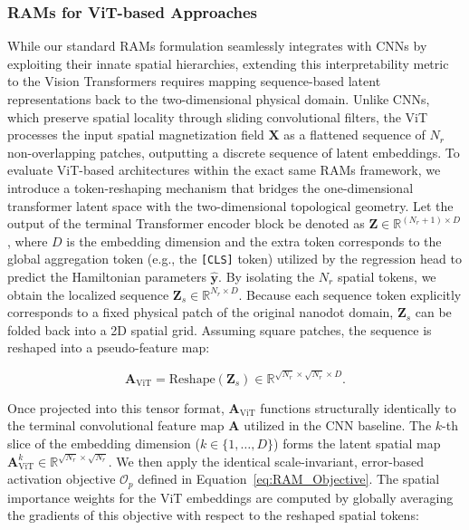 \documentclass[final,5p,times,twocolumn]{elsarticle}
\begin{document}
\subsubsection{RAMs for ViT-based Approaches}\label{sec:ViT_RAMs}
While our standard RAMs formulation seamlessly integrates with CNNs by exploiting their innate spatial hierarchies, extending this interpretability metric to the Vision Transformers requires mapping sequence-based latent representations back to the two-dimensional physical domain. Unlike CNNs, which preserve spatial locality through sliding convolutional filters, the ViT processes the input spatial magnetization field $\mathbf{X}$ as a flattened sequence of $N_r$ non-overlapping patches, outputting a discrete sequence of latent embeddings. To evaluate ViT-based architectures within the exact same RAMs framework, we introduce a token-reshaping mechanism that bridges the one-dimensional transformer latent space with the two-dimensional topological geometry. Let the output of the terminal Transformer encoder block be denoted as $\mathbf{Z} \in \mathbb{R}^{(N_r + 1) \times D}$, where $D$ is the embedding dimension and the extra token corresponds to the global aggregation token (e.g., the \texttt{[CLS]} token) utilized by the regression head to predict the Hamiltonian parameters $\hat{\mathbf{y}}$. By isolating the $N_r$ spatial tokens, we obtain the localized sequence $\mathbf{Z}_s \in \mathbb{R}^{N_r \times D}$. Because each sequence token explicitly corresponds to a fixed physical patch of the original nanodot domain, $\mathbf{Z}_s$ can be folded back into a 2D spatial grid. Assuming square patches, the sequence is reshaped into a pseudo-feature map:

\begin{equation}\label{eq:ViT_Reshape}
\mathbf{A}_{\text{ViT}} = \text{Reshape}(\mathbf{Z}_s) \in \mathbb{R}^{\sqrt{N_r} \times \sqrt{N_r} \times D}.
\end{equation}

Once projected into this tensor format, $\mathbf{A}_{\text{ViT}}$ functions structurally identically to the terminal convolutional feature map $\mathbf{A}$ utilized in the CNN baseline. The $k$-th slice of the embedding dimension ($k \in \{1, \dots, D\}$) forms the latent spatial map $\mathbf{A}_{\text{ViT}}^k \in \mathbb{R}^{\sqrt{N_r} \times \sqrt{N_r}}$. We then apply the identical scale-invariant, error-based activation objective $\mathcal{O}_p$ defined in Equation~\ref{eq:RAM_Objective}. The spatial importance weights for the ViT embeddings are computed by globally averaging the gradients of this objective with respect to the reshaped spatial tokens:
\end{document}
